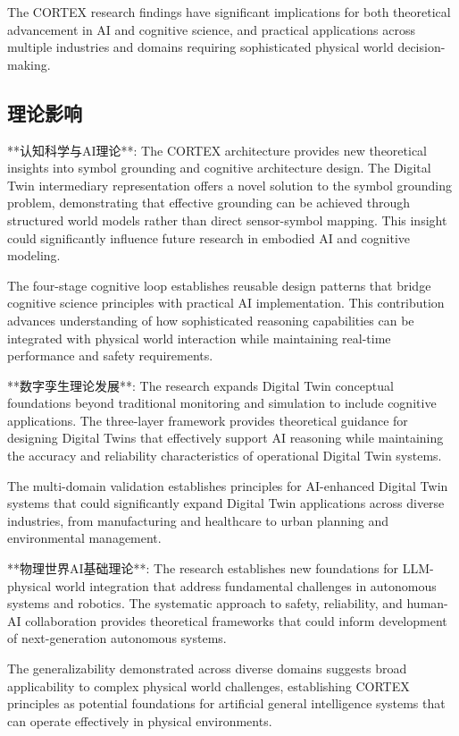 The CORTEX research findings have significant implications for both theoretical advancement in AI and cognitive science, and practical applications across multiple industries and domains requiring sophisticated physical world decision-making.

\subsection{理论影响}

**认知科学与AI理论**:
The CORTEX architecture provides new theoretical insights into symbol grounding and cognitive architecture design. The Digital Twin intermediary representation offers a novel solution to the symbol grounding problem, demonstrating that effective grounding can be achieved through structured world models rather than direct sensor-symbol mapping. This insight could significantly influence future research in embodied AI and cognitive modeling.

The four-stage cognitive loop establishes reusable design patterns that bridge cognitive science principles with practical AI implementation. This contribution advances understanding of how sophisticated reasoning capabilities can be integrated with physical world interaction while maintaining real-time performance and safety requirements.

**数字孪生理论发展**:
The research expands Digital Twin conceptual foundations beyond traditional monitoring and simulation to include cognitive applications. The three-layer framework provides theoretical guidance for designing Digital Twins that effectively support AI reasoning while maintaining the accuracy and reliability characteristics of operational Digital Twin systems.

The multi-domain validation establishes principles for AI-enhanced Digital Twin systems that could significantly expand Digital Twin applications across diverse industries, from manufacturing and healthcare to urban planning and environmental management.

**物理世界AI基础理论**:
The research establishes new foundations for LLM-physical world integration that address fundamental challenges in autonomous systems and robotics. The systematic approach to safety, reliability, and human-AI collaboration provides theoretical frameworks that could inform development of next-generation autonomous systems.

The generalizability demonstrated across diverse domains suggests broad applicability to complex physical world challenges, establishing CORTEX principles as potential foundations for artificial general intelligence systems that can operate effectively in physical environments.

